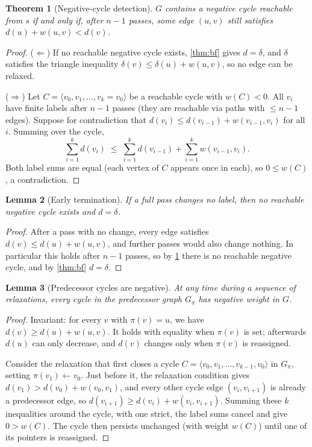 \documentclass[11pt,a4paper]{article}
\newtheorem{theorem}{Theorem}
\newtheorem{lemma}[theorem]{Lemma}
\theoremstyle{definition}
\newcommand{\dd}{\mathit{d}}
\newcommand{\pred}{\pi}
\begin{document}
\begin{theorem}[Negative-cycle detection]\label{thm:negcycle}
$G$ contains a negative cycle reachable from $s$ if and only if, after $n-1$ passes, some edge $(u,v)$ still satisfies $\dd(u)+w(u,v)<\dd(v)$.
\end{theorem}
\begin{proof}
($\Leftarrow$) If no reachable negative cycle exists, \cref{thm:bf} gives $\dd=\delta$, and $\delta$ satisfies the triangle inequality $\delta(v)\le\delta(u)+w(u,v)$, so no edge can be relaxed.

($\Rightarrow$) Let $C=\langle v_0,v_1,\dots,v_{k}=v_0\rangle$ be a reachable cycle with $w(C)<0$. All $v_i$ have finite labels after $n-1$ passes (they are reachable via paths with $\le n-1$ edges). Suppose for contradiction that $\dd(v_i)\le\dd(v_{i-1})+w(v_{i-1},v_i)$ for all $i$. Summing over the cycle,
\[
\sum_{i=1}^{k}\dd(v_i)\;\le\;\sum_{i=1}^{k}\dd(v_{i-1})+\sum_{i=1}^{k}w(v_{i-1},v_i).
\]
Both label sums are equal (each vertex of $C$ appears once in each), so $0\le w(C)$, a contradiction.
\end{proof}

\begin{lemma}[Early termination]\label{lem:early}
If a full pass changes no label, then no reachable negative cycle exists and $\dd=\delta$.
\end{lemma}
\begin{proof}
After a pass with no change, every edge satisfies $\dd(v)\le\dd(u)+w(u,v)$, and further passes would also change nothing. In particular this holds after $n-1$ passes, so by \cref{thm:negcycle} there is no reachable negative cycle, and by \cref{thm:bf} $\dd=\delta$.
\end{proof}

\begin{lemma}[Predecessor cycles are negative]\label{lem:predcycle}
At any time during a sequence of relaxations, every cycle in the predecessor graph $G_\pred$ has negative weight in $G$.
\end{lemma}
\begin{proof}
Invariant: for every $v$ with $\pred(v)=u$, we have $\dd(v)\ge\dd(u)+w(u,v)$. It holds with equality when $\pred(v)$ is set; afterwards $\dd(u)$ can only decrease, and $\dd(v)$ changes only when $\pred(v)$ is reassigned.

Consider the relaxation that first closes a cycle $C=\langle v_0,v_1,\dots,v_{k-1},v_0\rangle$ in $G_\pred$, setting $\pred(v_1)\gets v_0$. Just before it, the relaxation condition gives $\dd(v_1)>\dd(v_0)+w(v_0,v_1)$, and every other cycle edge $(v_{i},v_{i+1})$ is already a predecessor edge, so $\dd(v_{i+1})\ge\dd(v_i)+w(v_i,v_{i+1})$. Summing these $k$ inequalities around the cycle, with one strict, the label sums cancel and give $0>w(C)$. The cycle then persists unchanged (with weight $w(C)$) until one of its pointers is reassigned.
\end{proof}
\end{document}
